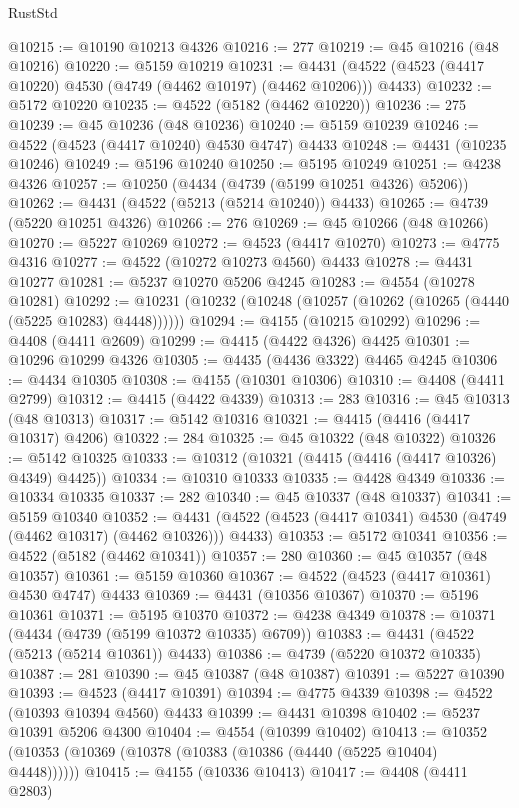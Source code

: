 \begin{lexlean}{RustStd}
\begin{coremodule}
@10215 := @10190 @10213 @4326
@10216 := 277
@10219 := @45 @10216 (@48 @10216)
@10220 := @5159 @10219
@10231 := @4431 (@4522 (@4523 (@4417 @10220) @4530 (@4749 (@4462 @10197) (@4462 @10206))) @4433)
@10232 := @5172 @10220
@10235 := @4522 (@5182 (@4462 @10220))
@10236 := 275
@10239 := @45 @10236 (@48 @10236)
@10240 := @5159 @10239
@10246 := @4522 (@4523 (@4417 @10240) @4530 @4747) @4433
@10248 := @4431 (@10235 @10246)
@10249 := @5196 @10240
@10250 := @5195 @10249
@10251 := @4238 @4326
@10257 := @10250 (@4434 (@4739 (@5199 @10251 @4326) @5206))
@10262 := @4431 (@4522 (@5213 (@5214 @10240)) @4433)
@10265 := @4739 (@5220 @10251 @4326)
@10266 := 276
@10269 := @45 @10266 (@48 @10266)
@10270 := @5227 @10269
@10272 := @4523 (@4417 @10270)
@10273 := @4775 @4316
@10277 := @4522 (@10272 @10273 @4560) @4433
@10278 := @4431 @10277
@10281 := @5237 @10270 @5206 @4245
@10283 := @4554 (@10278 @10281)
@10292 := @10231 (@10232 (@10248 (@10257 (@10262 (@10265 (@4440 (@5225 @10283) @4448))))))
@10294 := @4155 (@10215 @10292)
@10296 := @4408 (@4411 @2609)
@10299 := @4415 (@4422 @4326) @4425
@10301 := @10296 @10299 @4326
@10305 := @4435 (@4436 @3322) @4465 @4245
@10306 := @4434 @10305
@10308 := @4155 (@10301 @10306)
@10310 := @4408 (@4411 @2799)
@10312 := @4415 (@4422 @4339)
@10313 := 283
@10316 := @45 @10313 (@48 @10313)
@10317 := @5142 @10316
@10321 := @4415 (@4416 (@4417 @10317) @4206)
@10322 := 284
@10325 := @45 @10322 (@48 @10322)
@10326 := @5142 @10325
@10333 := @10312 (@10321 (@4415 (@4416 (@4417 @10326) @4349) @4425))
@10334 := @10310 @10333
@10335 := @4428 @4349
@10336 := @10334 @10335
@10337 := 282
@10340 := @45 @10337 (@48 @10337)
@10341 := @5159 @10340
@10352 := @4431 (@4522 (@4523 (@4417 @10341) @4530 (@4749 (@4462 @10317) (@4462 @10326))) @4433)
@10353 := @5172 @10341
@10356 := @4522 (@5182 (@4462 @10341))
@10357 := 280
@10360 := @45 @10357 (@48 @10357)
@10361 := @5159 @10360
@10367 := @4522 (@4523 (@4417 @10361) @4530 @4747) @4433
@10369 := @4431 (@10356 @10367)
@10370 := @5196 @10361
@10371 := @5195 @10370
@10372 := @4238 @4349
@10378 := @10371 (@4434 (@4739 (@5199 @10372 @10335) @6709))
@10383 := @4431 (@4522 (@5213 (@5214 @10361)) @4433)
@10386 := @4739 (@5220 @10372 @10335)
@10387 := 281
@10390 := @45 @10387 (@48 @10387)
@10391 := @5227 @10390
@10393 := @4523 (@4417 @10391)
@10394 := @4775 @4339
@10398 := @4522 (@10393 @10394 @4560) @4433
@10399 := @4431 @10398
@10402 := @5237 @10391 @5206 @4300
@10404 := @4554 (@10399 @10402)
@10413 := @10352 (@10353 (@10369 (@10378 (@10383 (@10386 (@4440 (@5225 @10404) @4448))))))
@10415 := @4155 (@10336 @10413)
@10417 := @4408 (@4411 @2803)

\end{coremodule}
\end{lexlean}
